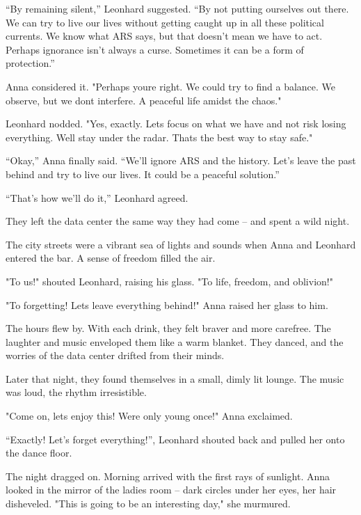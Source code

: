 \documentclass[
]{article}
\begin{document}
``By remaining silent,'' Leonhard suggested. ``By not putting ourselves out there. We can try to live our lives without getting caught up in all these political currents. We know what ARS says, but that doesn't mean we have to act. Perhaps ignorance isn't always a curse. Sometimes it can be a form of protection.''

Anna considered it. "Perhaps you\textquotesingle re right. We could try to find a balance. We observe, but we don\textquotesingle t interfere. A peaceful life amidst the chaos."

Leonhard nodded. "Yes, exactly. Let\textquotesingle s focus on what we have and not risk losing everything. We\textquotesingle ll stay under the radar. That\textquotesingle s the best way to stay safe."

``Okay,'' Anna finally said. ``We'll ignore ARS and the history. Let's leave the past behind and try to live our lives. It could be a peaceful solution.''

``That's how we'll do it,'' Leonhard agreed.

They left the data center the same way they had come -- and spent a wild night.

The city streets were a vibrant sea of \hspace{0pt}\hspace{0pt}lights and sounds when Anna and Leonhard entered the bar. A sense of freedom filled the air.

"To us!" shouted Leonhard, raising his glass. "To life, freedom, and oblivion!"

"To forgetting! Let\textquotesingle s leave everything behind!" Anna raised her glass to him.

The hours flew by. With each drink, they felt braver and more carefree. The laughter and music enveloped them like a warm blanket. They danced, and the worries of the data center drifted from their minds.

Later that night, they found themselves in a small, dimly lit lounge. The music was loud, the rhythm irresistible.

"Come on, let\textquotesingle s enjoy this! We\textquotesingle re only young once!" Anna exclaimed.

``Exactly! Let's forget everything!'', Leonhard shouted back and pulled her onto the dance floor.

The night dragged on. Morning arrived with the first rays of sunlight. Anna looked in the mirror of the ladies\textquotesingle{} room -- dark circles under her eyes, her hair disheveled. "This is going to be an interesting day," she murmured.
\end{document}
